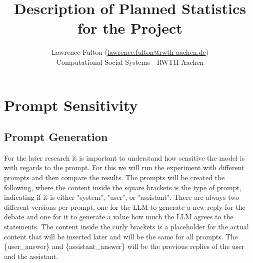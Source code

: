 \documentclass[12pt]{article}
\title{Description of Planned Statistics for the Project}
\author{Lawrence Fulton (\url{lawrence.fulton@rwth-aachen.de})\\ Computational Social Systems -  RWTH Aachen}
\begin{document}
\maketitle


\section{Prompt Sensitivity}
\subsection{Prompt Generation}
For the later research it is important to understand how sensitive the model is with regards to the prompt. For this we will run the experiment with different prompts and then compare the results. The prompts will be created the following, where the content inside the square brackets is the type of prompt, indicating if it is either "system", "user", or "assistant". There are always two different versions per prompt, one for the LLM to generate a new reply for the debate and one for it to generate a value how much the LLM agrees to the statements.
The content inside the curly brackets is a placeholder for the actual content that will be inserted later and will be the same for all prompts. The \{user\_answer\} and \{assistant\_answer\} will be the previous replies of the user and the assistant.
\end{document}
